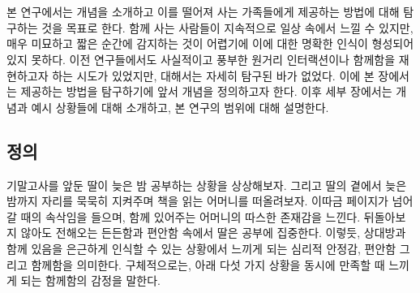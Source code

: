 \chapter{\concept}
\label{sec:concept}



본 연구에서는 \concept{} 개념을 소개하고 이를 떨어져 사는 가족들에게 제공하는 방법에 대해 탐구하는 것을 목표로 한다. \concept\은 함께 사는 사람들이 지속적으로 일상 속에서 느낄 수 있지만, 매우 미묘하고 짧은 순간에 감지하는 것이 어렵기에 이에 대한 명확한 인식이 형성되어 있지 못하다. 이전 연구들에서도 사실적이고 풍부한 원거리 인터랙션이나 함께함을 재현하고자 하는 시도가 있었지만,  대해서는 자세히 탐구된 바가 없었다. 이에 본 장에서는 \concept\을 제공하는 방법을 탐구하기에 앞서 \concept{} 개념을 정의하고자 한다. 이후 세부 장에서는  개념과 예시 상황들에 대해 소개하고, 본 연구의 범위에 대해 설명한다. 

\section{ 정의}

기말고사를 앞둔 딸이 늦은 밤 공부하는 상황을 상상해보자. 그리고 딸의 곁에서 늦은 밤까지 자리를 묵묵히 지켜주며 책을 읽는 어머니를 떠올려보자. %
이따금 페이지가 넘어갈 때의 속삭임을 들으며, 함께 있어주는 어머니의 따스한 존재감을 느낀다. 뒤돌아보지 않아도 전해오는 든든함과 편안함 속에서 딸은 공부에 집중한다.
이렇듯, \concept\은 상대방과 함께 있음을 은근하게 인식할 수 있는 상황에서 느끼게 되는 심리적 안정감, 편안함 그리고 함께함을 의미한다.
구체적으로는, 아래 다섯 가지 상황을 동시에 만족할 때 느끼게 되는 함께함의 감정을 말한다. %



